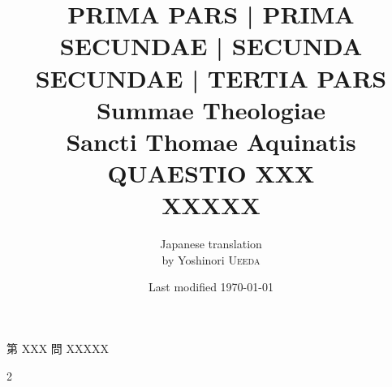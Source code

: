 \documentclass[paper=a4paper,fontsize=10pt,jafontsize=9pt,titlepage]{jlreq}
\title{{\bfseries PRIMA PARS | PRIMA SECUNDAE | SECUNDA SECUNDAE | TERTIA PARS}\\{\Huge Summae Theologiae}\\Sancti Thomae
Aquinatis\\{\sffamily QUAESTIO XXX}\\XXXXX}
\author{Japanese translation\\by Yoshinori {\scshape Ueeda}}
\date{Last modified \today}
\begin{document}
\maketitle
\pagestyle{fancy}

\begin{center}
{\Large 第 XXX 問 XXXXX\\}
\end{center}

\begin{paracol}{2}



\switchcolumn



\end{paracol}

\newpage

\end{document}
